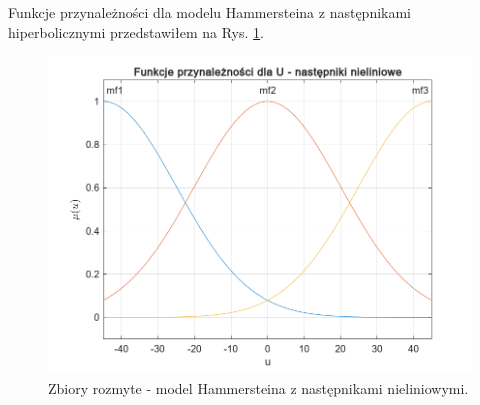 \newpage

Funkcje przynależności dla modelu Hammersteina z następnikami hiperbolicznymi przedstawiłem na Rys. \ref{HammersteinfuzzySets_nieliniowe}.

\begin{figure}[h!]
\centering
\includegraphics[width=\textwidth]{pictures/HammersteinfuzzySets_nieliniowe}
\caption{Zbiory rozmyte - model Hammersteina z następnikami nieliniowymi.}
\label{HammersteinfuzzySets_nieliniowe}
\end{figure}
